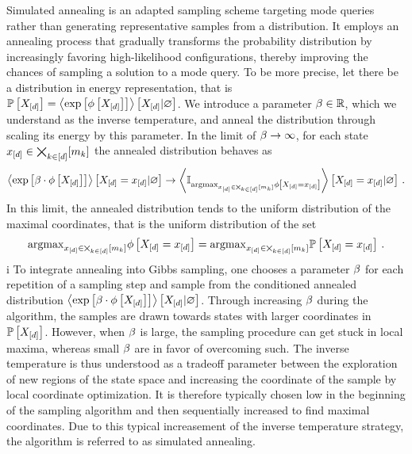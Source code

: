 Simulated annealing is an adapted sampling scheme targeting mode queries rather than generating representative samples from a distribution.
It employs an annealing process that gradually transforms the probability distribution by increasingly favoring high-likelihood configurations, thereby improving the chances of sampling a solution to a mode query.
To be more precise, let there be a distribution in energy representation, that is $\mathbb{P}\left[X_{[d]}\right]=\left\langle \mathrm{exp}\left[\phi\left[X_{[d]}\right]\right]\right\rangle \left[ X_{[d]} | \varnothing \right]$.
We introduce a parameter $\beta\in\mathbb{R}$, which we understand as the inverse temperature, and anneal the distribution through scaling its energy by this parameter.
In the limit of $\beta\rightarrow\infty$, for each state $x_{[d]}\in\bigtimes_{k\in[d]}[m_{k}]$ the annealed distribution behaves as
\begin{align*}
    \left\langle \mathrm{exp}\left[\beta\cdot\phi\left[X_{[d]}\right]\right]\right\rangle \left[ X_{[d]}=x_{[d]} | \varnothing \right] \rightarrow
    \left\langle \mathbb{I}_{\mathrm{argmax}_{x_{[d]}\in\bigtimes_{k\in[d]}[m_{k}]}\phi\left[X_{[d]}=x_{[d]}\right]}\right\rangle \left[ X_{[d]}=x_{[d]} | \varnothing \right] \, .
\end{align*}
In this limit, the annealed distribution tends to the uniform distribution of the maximal coordinates, that is the uniform distribution of the set
\begin{align*}
    \mathrm{argmax}_{x_{[d]}\in\bigtimes_{k\in[d]}[m_{k}]}\phi\left[X_{[d]}=x_{[d]}\right] = \mathrm{argmax}_{x_{[d]}\in\bigtimes_{k\in[d]}[m_{k}]}\mathbb{P}\left[X_{[d]}=x_{[d]}\right] \, .
\end{align*}
i
To integrate annealing into Gibbs sampling, one chooses a parameter $\beta$ for each repetition of a sampling step and sample from the conditioned annealed distribution $\left\langle \mathrm{exp}\left[\beta\cdot\phi\left[X_{[d]}\right]\right]\right\rangle \left[ X_{[d]} | \varnothing \right]$.
Through increasing $\beta$ during the algorithm, the samples are drawn towards states with larger coordinates in $\mathbb{P}\left[X_{[d]}\right]$.
However, when $\beta$ is large, the sampling procedure can get stuck in local maxima, whereas small $\beta$ are in favor of overcoming such.
The inverse temperature is thus understood as a tradeoff parameter between the exploration of new regions of the state space and increasing the coordinate of the sample by local coordinate optimization.
It is therefore typically chosen low in the beginning of the sampling algorithm and then sequentially increased to find maximal coordinates.
Due to this typical increasement of the inverse temperature strategy, the algorithm is referred to as simulated annealing.



